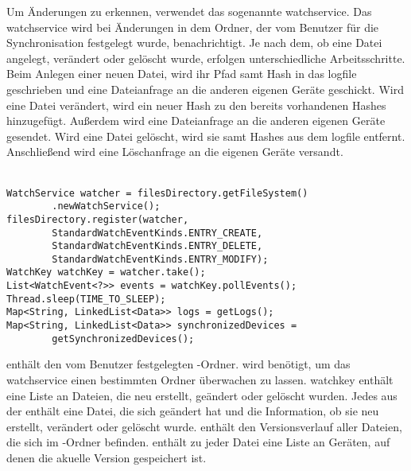 Um Änderungen zu erkennen, verwendet \sblit das sogenannte \gls{watchservice}. Das \gls{watchservice} wird bei Änderungen in dem Ordner, der vom Benutzer für die Synchronisation festgelegt wurde, benachrichtigt. Je nach dem, ob eine Datei angelegt, verändert oder gelöscht wurde, erfolgen unterschiedliche Arbeitsschritte. Beim Anlegen einer neuen Datei, wird ihr Pfad samt Hash in das \gls{logfile} geschrieben und eine Dateianfrage an die anderen eigenen Geräte geschickt. Wird eine Datei verändert, wird ein neuer Hash zu den bereits vorhandenen Hashes hinzugefügt. Außerdem wird eine Dateianfrage an die anderen eigenen Geräte gesendet. Wird eine Datei gelöscht, wird sie samt Hashes aus dem \gls{logfile} entfernt. Anschließend wird eine Löschanfrage an die eigenen Geräte versandt.\\ \\
\javalisting
\begin{minipage}{\linewidth}
\begin{lstlisting}[caption={Initialisierung des \gls{watchservice}},captionpos=b]
WatchService watcher = filesDirectory.getFileSystem()
		.newWatchService();
filesDirectory.register(watcher,
		StandardWatchEventKinds.ENTRY_CREATE,
		StandardWatchEventKinds.ENTRY_DELETE,
		StandardWatchEventKinds.ENTRY_MODIFY);
WatchKey watchKey = watcher.take();
List<WatchEvent<?>> events = watchKey.pollEvents();
Thread.sleep(TIME_TO_SLEEP);
Map<String, LinkedList<Data>> logs = getLogs();
Map<String, LinkedList<Data>> synchronizedDevices = 
		getSynchronizedDevices();
\end{lstlisting}
\end{minipage}
\begin{description}
	 enthält den vom Benutzer festgelegten \sblit-Ordner.
	 wird benötigt, um das \gls{watchservice} einen bestimmten Ordner überwachen zu lassen.
	\gls{watchkey} enthält eine Liste an Dateien, die neu erstellt, geändert oder gelöscht wurden.
	Jedes  aus der  enthält eine Datei, die sich geändert hat und die Information, ob sie neu erstellt, verändert oder gelöscht wurde. 
	 enthält den Versionsverlauf aller Dateien, die sich im \sblit-Ordner befinden.
	 enthält zu jeder Datei eine Liste an Geräten, auf denen die akuelle Version gespeichert ist.
\end{description}
